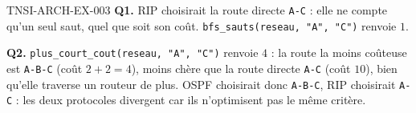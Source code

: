 \begin{corrige}{TNSI-ARCH-EX-003}
\textbf{Q1.} RIP choisirait la route directe \texttt{A-C} : elle ne compte qu'un seul saut, quel que soit son coût. \lstinline{bfs_sauts(reseau, "A", "C")} renvoie $1$.

\textbf{Q2.} \lstinline{plus_court_cout(reseau, "A", "C")} renvoie $4$ : la route la moins coûteuse est \texttt{A-B-C} (coût $2+2=4$), moins chère que la route directe \texttt{A-C} (coût $10$), bien qu'elle traverse un routeur de plus. OSPF choisirait donc \texttt{A-B-C}, RIP choisirait \texttt{A-C} : les deux protocoles divergent car ils n'optimisent pas le même critère.
\end{corrige}

